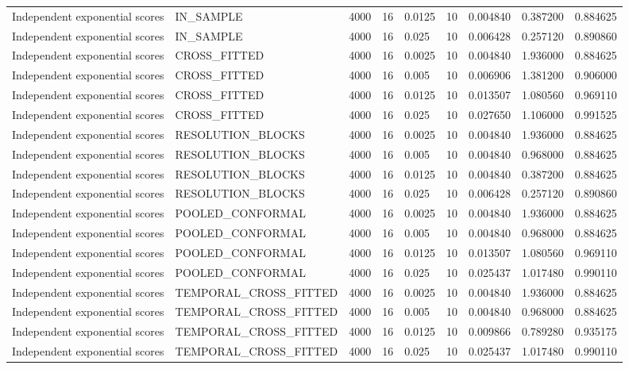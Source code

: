 \begin{tabular}{lllllllll}
Independent exponential scores & IN\_SAMPLE & 4000 & 16 & 0.0125 & 10 & 0.004840 & 0.387200 & 0.884625 \\
Independent exponential scores & IN\_SAMPLE & 4000 & 16 & 0.025 & 10 & 0.006428 & 0.257120 & 0.890860 \\
Independent exponential scores & CROSS\_FITTED & 4000 & 16 & 0.0025 & 10 & 0.004840 & 1.936000 & 0.884625 \\
Independent exponential scores & CROSS\_FITTED & 4000 & 16 & 0.005 & 10 & 0.006906 & 1.381200 & 0.906000 \\
Independent exponential scores & CROSS\_FITTED & 4000 & 16 & 0.0125 & 10 & 0.013507 & 1.080560 & 0.969110 \\
Independent exponential scores & CROSS\_FITTED & 4000 & 16 & 0.025 & 10 & 0.027650 & 1.106000 & 0.991525 \\
Independent exponential scores & RESOLUTION\_BLOCKS & 4000 & 16 & 0.0025 & 10 & 0.004840 & 1.936000 & 0.884625 \\
Independent exponential scores & RESOLUTION\_BLOCKS & 4000 & 16 & 0.005 & 10 & 0.004840 & 0.968000 & 0.884625 \\
Independent exponential scores & RESOLUTION\_BLOCKS & 4000 & 16 & 0.0125 & 10 & 0.004840 & 0.387200 & 0.884625 \\
Independent exponential scores & RESOLUTION\_BLOCKS & 4000 & 16 & 0.025 & 10 & 0.006428 & 0.257120 & 0.890860 \\
Independent exponential scores & POOLED\_CONFORMAL & 4000 & 16 & 0.0025 & 10 & 0.004840 & 1.936000 & 0.884625 \\
Independent exponential scores & POOLED\_CONFORMAL & 4000 & 16 & 0.005 & 10 & 0.004840 & 0.968000 & 0.884625 \\
Independent exponential scores & POOLED\_CONFORMAL & 4000 & 16 & 0.0125 & 10 & 0.013507 & 1.080560 & 0.969110 \\
Independent exponential scores & POOLED\_CONFORMAL & 4000 & 16 & 0.025 & 10 & 0.025437 & 1.017480 & 0.990110 \\
Independent exponential scores & TEMPORAL\_CROSS\_FITTED & 4000 & 16 & 0.0025 & 10 & 0.004840 & 1.936000 & 0.884625 \\
Independent exponential scores & TEMPORAL\_CROSS\_FITTED & 4000 & 16 & 0.005 & 10 & 0.004840 & 0.968000 & 0.884625 \\
Independent exponential scores & TEMPORAL\_CROSS\_FITTED & 4000 & 16 & 0.0125 & 10 & 0.009866 & 0.789280 & 0.935175 \\
Independent exponential scores & TEMPORAL\_CROSS\_FITTED & 4000 & 16 & 0.025 & 10 & 0.025437 & 1.017480 & 0.990110 \\

\end{tabular}
